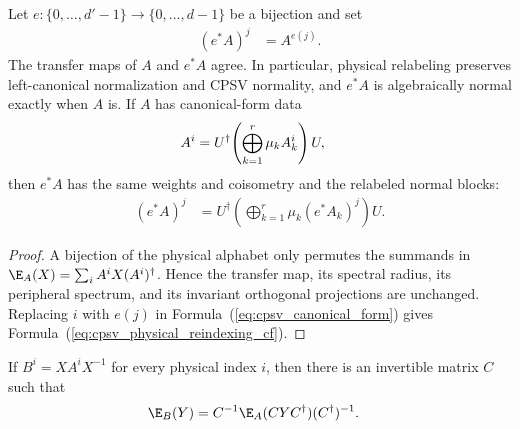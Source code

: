 \begin{lemma}
    \label{thm:cpsv_physical_reindexing}
    \leanok
    Let $e:\{0,\ldots,d'-1\}\to\{0,\ldots,d-1\}$ be a bijection and set
    \begin{align}
        (e^*A)^j
         & = A^{e(j)}.
        \label{eq:cpsv_physical_reindexing_tensor}
    \end{align}
    The transfer maps of $A$ and $e^*A$ agree. In particular, physical
    relabeling preserves left-canonical normalization and CPSV normality,
    and $e^*A$ is algebraically normal exactly when $A$ is. If
    $A$ has canonical-form data
    \begin{align}
        A^i
         & =U^\dagger\!\left(\bigoplus_{k=1}^r\mu_kA_k^i\right)U,
        \notag
    \end{align}
    then $e^*A$ has the same weights and coisometry and the relabeled normal
    blocks:
    \begin{align}
        (e^*A)^j
         & =U^\dagger\!\left(\bigoplus_{k=1}^r
        \mu_k(e^*A_k)^j\right)U.
        \label{eq:cpsv_physical_reindexing_cf}
    \end{align}
\end{lemma}

\begin{proof}\leanok
    A bijection of the physical alphabet only permutes the summands in
    $\E_A(X)=\sum_iA^iX(A^i)^\dagger$. Hence the transfer map, its spectral
    radius, its peripheral spectrum, and its invariant orthogonal projections
    are unchanged. Replacing $i$ with $e(j)$ in
    Formula~(\ref{eq:cpsv_canonical_form}) gives
    Formula~(\ref{eq:cpsv_physical_reindexing_cf}).
\end{proof}

\begin{lemma}
    \label{thm:cpsv_gauge_transfer_similarity}
    \leanok
    If $B^i=XA^iX^{-1}$ for every physical index $i$, then there is an
    invertible matrix $C$ such that
    \begin{align}
        \E_B(Y)
         & =C^{-1}\E_A(CYC^\dagger)(C^\dagger)^{-1}.
        \notag
    \end{align}
\end{lemma}

